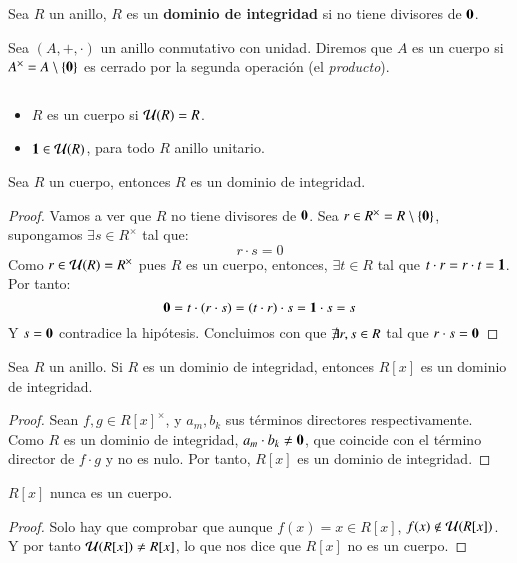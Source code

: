 \begin{dfn}
    Sea $R$ un anillo, $R$ es un \textbf{dominio de integridad} si no tiene divisores de $\mathbf{0}$.
\end{dfn}

\begin{dfn}[Cuerpo]
    Sea $(A, +, \cdot)$ un anillo conmutativo con unidad. Diremos que $A$ es un cuerpo si $A^{\times} = A\setminus \{\mathbf{0}\}$ es cerrado por la segunda operación (el \textit{producto}).
\end{dfn}

\begin{obs} $ $
    \begin{itemize}
        \item $R$ es un cuerpo si $\mathcal{U}(R) = R$.
        \item $\mathbf{1} \in \mathcal{U}(R)$, para todo $R$ anillo unitario.
    \end{itemize}
\end{obs}

\begin{pro}\label{pro:cuerpoDI}
    Sea $R$ un cuerpo, entonces $R$ es un dominio de integridad.
\end{pro}
\begin{proof}
    Vamos a ver que $R$ no tiene divisores de $\mathbf{0}$. Sea $r \in R^{\times} = R\setminus \{\mathbf{0}\}$, supongamos $\exists s \in R^{\times}$ tal que:
    $$
        r \cdot s = 0
    $$
    Como $r \in \mathcal{U}(R) = R^{\times}$ pues $R$ es un cuerpo, entonces, $\exists t \in R$ tal que $t\cdot r = r\cdot t = \mathbf{1}$. Por tanto:
    $$
        \mathbf{0} = t \cdot (r \cdot s) = (t \cdot r) \cdot s = \mathbf{1} \cdot s = s
    $$
    Y $s = \mathbf{0}$ contradice la hipótesis. Concluimos con que $\not \exists r, s \in R$ tal que $r \cdot s = \mathbf{0}$
\end{proof}

\begin{pro}
    Sea $R$ un anillo. Si $R$ es un dominio de integridad, entonces $R[x]$ es un dominio de integridad.
\end{pro}
\begin{proof}
    Sean $f, g \in R[x]^{\times}$, y $a_m, b_k$ sus términos directores respectivamente. Como $R$ es un dominio de integridad, $a_m \cdot b_k \neq \mathbf{0}$, que coincide con el término director de $f \cdot g$ y no es nulo. Por tanto, $R[x]$ es un dominio de integridad.
\end{proof}

\begin{pro}
    $R[x]$ nunca es un cuerpo.
\end{pro}
\begin{proof}
    Solo hay que comprobar que aunque $f(x) = x \in R[x]$, $f(x) \notin \mathcal{U}(R[x])$. Y por tanto $\mathcal{U}(R[x]) \neq R[x]$, lo que nos dice que $R[x]$ no es un cuerpo.
\end{proof}

